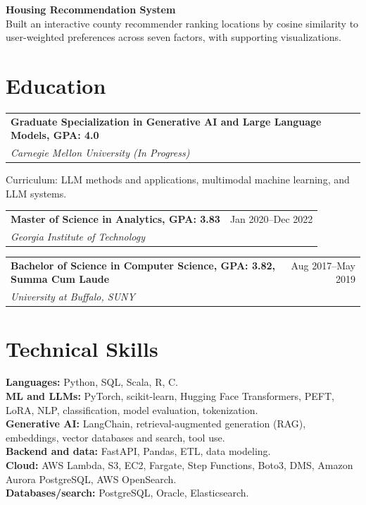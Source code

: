 \documentclass[11pt,a4paper]{article}
\makeatletter
\newcommand{\resumeentry}[4]{%
  \begin{tabularx}{\textwidth}{@{}Xr@{}}
    \textbf{#1} & \textcolor{muted}{#4} \\
    \textit{#2} & \textit{\textcolor{muted}{#3}}
  \end{tabularx}\par\vspace{-3pt}
}
\makeatother
\begin{document}
\vspace{3pt}
\textbf{Housing Recommendation System}\\[-2pt]
Built an interactive county recommender ranking locations by cosine similarity to user-weighted preferences across seven factors, with supporting visualizations.

\section{Education}

\resumeentry{Graduate Specialization in Generative AI and Large Language Models, GPA: 4.0}{Carnegie Mellon University (In Progress)}{}{}
\noindent Curriculum: LLM methods and applications, multimodal machine learning, and LLM systems.\par
\vspace{3pt}
\resumeentry{Master of Science in Analytics, GPA: 3.83}{Georgia Institute of Technology}{}{Jan 2020--Dec 2022}
\vspace{3pt}
\resumeentry{Bachelor of Science in Computer Science, GPA: 3.82, Summa Cum Laude}{University at Buffalo, SUNY}{}{Aug 2017--May 2019}

\section{Technical Skills}
\textbf{Languages:} Python, SQL, Scala, R, C.\\[2pt]
\textbf{ML and LLMs:} PyTorch, scikit-learn, Hugging Face Transformers, PEFT, LoRA, NLP, classification, model evaluation, tokenization.\\[2pt]
\textbf{Generative AI:} LangChain, retrieval-augmented generation (RAG), embeddings, vector databases and search, tool use.\\[2pt]
\textbf{Backend and data:} FastAPI, Pandas, ETL, data modeling.\\[2pt]
\textbf{Cloud:} AWS Lambda, S3, EC2, Fargate, Step Functions, Boto3, DMS, Amazon Aurora PostgreSQL, AWS OpenSearch.\\[2pt]
\textbf{Databases/search:} PostgreSQL, Oracle, Elasticsearch.
\end{document}
